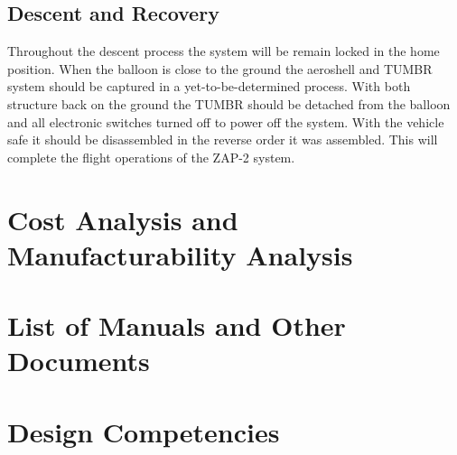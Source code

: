 \subsection*{Descent and Recovery}

\indent\indent Throughout the descent process the system will be remain locked in the home position. When the balloon is close to the ground the aeroshell and TUMBR system should be captured in a yet-to-be-determined process. With both structure back on the ground the TUMBR should be detached from the balloon and all electronic switches turned off to power off the system. With the vehicle safe it should be disassembled in the reverse order it was assembled. This will complete the flight operations of the ZAP-2 system.


\section{Cost Analysis and Manufacturability Analysis}






\section{List of Manuals and Other Documents}


\section{Design Competencies}


